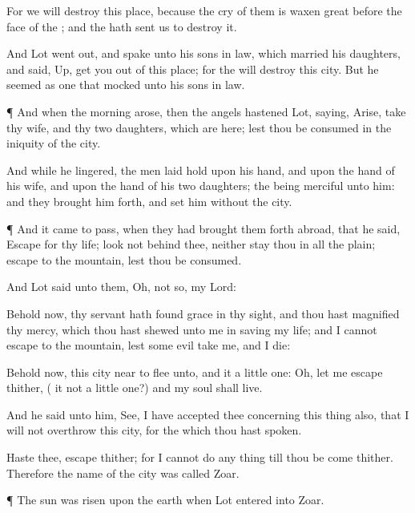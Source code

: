 {For
we will
destroy this
place, because the cry of
them is waxen
great
before the
face of the
{}; and the
{} hath
sent us to
destroy it.

And
Lot went
out, and
spake unto his sons in
law, which
married his
daughters, and
said,
Up, get you
out of this
place; for the
{} will
destroy this
city. But he seemed as one that
mocked
unto his sons in
law.


\par }{\PP {}¶ And
when the
morning
arose, then the
angels
hastened
Lot,
saying,
Arise,
take thy
wife, and thy
two
daughters, which are
here; lest thou be
consumed in the
iniquity of the
city.

And while he
lingered, the
men laid
hold upon his
hand, and upon the
hand of his
wife, and upon the
hand of his
two
daughters; the
{} being
merciful unto him: and they brought him
forth, and set
him
without the
city.


\par }{\PP {}¶ And it came to pass, when they had brought them
forth
abroad, that he
said,
Escape
for thy
life;
look not behind
thee, neither
stay thou in all the
plain;
escape to the
mountain, lest thou be
consumed.

And
Lot
said unto them, Oh, not so, my
Lord:

Behold now, thy
servant hath
found
grace in thy
sight, and thou hast
magnified thy
mercy, which thou hast
shewed unto
me in
saving my
life; and I
cannot
escape to the
mountain, lest some
evil
take me, and I
die:

Behold now, this
city
{}
near to
flee unto, and
it
{} a little
one: Oh, let me
escape thither, ({} it not a little
one?) and my
soul shall
live.

And he
said unto him,
See, I have
accepted
thee concerning this
thing also, that I will not
overthrow this
city, for the
which thou hast
spoken.

Haste thee,
escape thither; for I
cannot
do any
thing till thou be
come thither. Therefore the
name of the
city was
called
Zoar.


\par }{\PP {}¶ The
sun was
risen upon the
earth when
Lot
entered into
Zoar.


}
